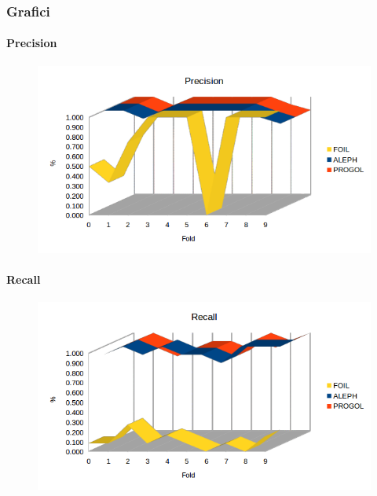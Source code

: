 \subsubsection{Grafici}
\paragraph{Precision}
\begin{figure}[hbtp]
	\includegraphics[width=1.2\textwidth]{img/datasetGraph/mlj/nodiscr/precision.png}
	\label{mljnodiscr-Precision}
\end{figure}
\paragraph{Recall}
\begin{figure}[hbtp]
	\includegraphics[width=1.2\textwidth]{img/datasetGraph/mlj/nodiscr/recall.png}
	\label{mljnodiscr-Recall}
\end{figure}
